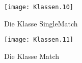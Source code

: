 \begin{appendix}
\begin{landscape}
\begin{figure}	
	\texttt{[image: Klassen.10]}
	\caption{Die Klasse SingleMatch}
	\label{fig:UML_SingleMatch}
\end{figure}

\begin{figure}	
	\texttt{[image: Klassen.11]}
	\caption{Die Klasse Match}
	\label{fig:UML_Match}
\end{figure}

\end{landscape}
  
  
 \printindex
 \setcounter{chapter}{4}



\listoffigures
 \end{appendix}